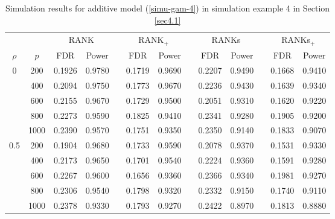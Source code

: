 \documentclass[11pt]{article}
\begin{document}
\begin{table}[htp!]
	\centering
	\caption{\label{tab-gam} Simulation results for additive model (\ref{simu-gam-4}) in simulation example 4 in Section \ref{sec4.1} %
}
	\vskip0.2cm
	\tabcolsep 0.15cm
	\begin{tabular}{ccccccccccccc}
		\toprule
	&	&  \multicolumn{2}{c}{RANK}&&\multicolumn{2}{c}{RANK$_+$} &&\multicolumn{2}{c}{RANKs}&&\multicolumn{2}{c}{RANKs$_+$}     \\
		\cline{3-4}\cline{6-7}\cline{9-10}\cline{12-13}
$\rho$	&	$ p$ &FDR & Power &  & FDR& Power && FDR & Power &  & FDR& Power  \\
		\hline
0&		200 &0.1926 &0.9780 &&0.1719 &0.9690 &&0.2207 &0.9490 &&0.1668 & 0.9410 \\
	&	400 &0.2094 &0.9750 &&0.1773 &0.9670 &&0.2236 &0.9430 &&0.1639 & 0.9340 \\
	&	600 &0.2155 &0.9670 &&0.1729 &0.9500 &&0.2051 &0.9310 &&0.1620 & 0.9220 \\
	&	800 &0.2273 &0.9590 &&0.1825 &0.9410 &&0.2341 &0.9280 &&0.1905  &0.9200       \\
        &  1000   &0.2390 & 0.9570 &&0.1751 &0.9350 &&0.2350 &0.9140 &&0.1833 &0.9070           \\
0.5   &      200 &0.1904 &0.9680  &&0.1733 & 0.9590&&0.2078 &0.9370  &&0.1531  &0.9330    \\
      &	400         &0.2173 & 0.9650 &&0.1701 & 0.9540&&0.2224 &0.9360  &&0.1591  &0.9280           \\
&	        600 &0.2267 & 0.9600 &&0.1656 & 0.9360&&0.2366 &0.9340  &&0.1981  &0.9270           \\
&	        800 &0.2306 & 0.9540 &&0.1798 & 0.9320&&0.2332 &0.9150  &&0.1740  &0.9110           \\
&          1000   &0.2378 &0.9330 &&0.1793  &0.9270 &&0.2422 &0.8970  &&0.1813  &0.8880           \\
		\bottomrule
	\end{tabular}
\end{table}
\end{document}
